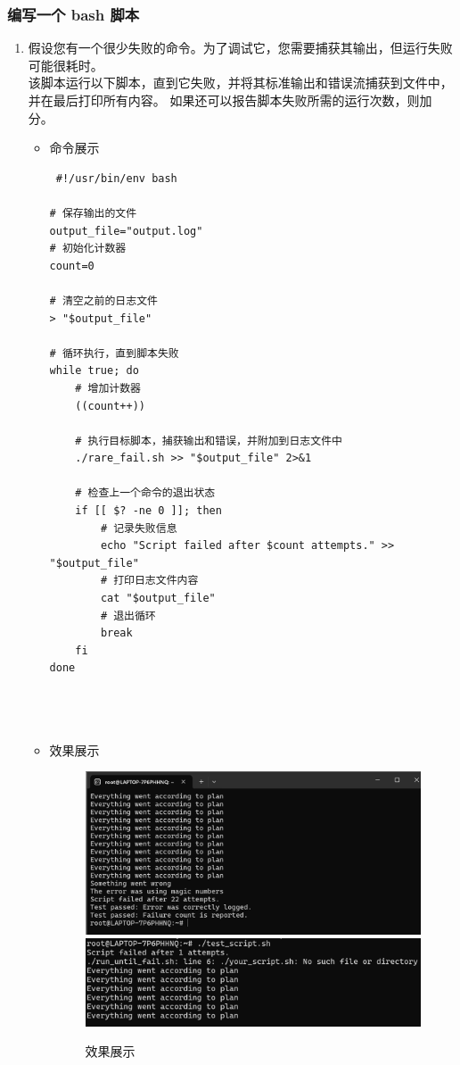 \documentclass[UTF8]{ctexart}
\begin{document}
\subsubsection{ 编写一个 bash 脚本}

\begin{enumerate}
  \item  假设您有一个很少失败的命令。为了调试它，您需要捕获其输出，但运行失败可能很耗时。\\该脚本运行以下脚本，直到它失败，并将其标准输出和错误流捕获到文件中，并在最后打印所有内容。 如果还可以报告脚本失败所需的运行次数，则加分。
  \begin{itemize}
  \item 命令展示
  \begin{verbatim}
 #!/usr/bin/env bash

# 保存输出的文件
output_file="output.log"
# 初始化计数器
count=0

# 清空之前的日志文件
> "$output_file"

# 循环执行，直到脚本失败
while true; do
    # 增加计数器
    ((count++))
    
    # 执行目标脚本，捕获输出和错误，并附加到日志文件中
    ./rare_fail.sh >> "$output_file" 2>&1
    
    # 检查上一个命令的退出状态
    if [[ $? -ne 0 ]]; then
        # 记录失败信息
        echo "Script failed after $count attempts." >> "$output_file"
        # 打印日志文件内容
        cat "$output_file"
        # 退出循环
        break
    fi
done


    
  \end{verbatim}

  \item 效果展示
  \begin{figure}[H]
    \centering
    \includegraphics[width=\textwidth]{2} %
     \includegraphics[width=\textwidth]{3} %
    \caption{效果展示}
  
  \end{figure}
\end{itemize}
\end{enumerate}
\end{document}
